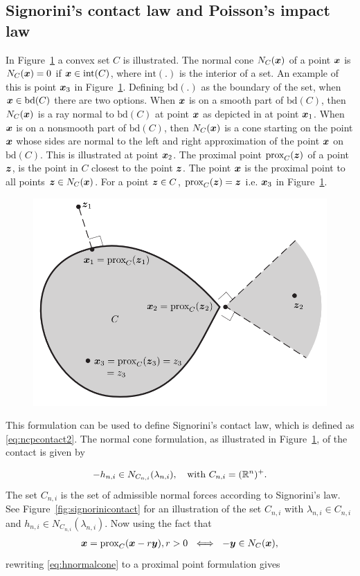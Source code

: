 \documentclass[../DC2017114Bouma.tex]{subfiles}
\begin{document}
\subsection{Signorini's contact law and Poisson's impact law}
In Figure~\ref{fig:convex} a convex set $C$ is illustrated. The normal cone $N_C({\boldsymbol{x}})$ of a point ${\boldsymbol{x}}$ is $N_C({\boldsymbol{x}})=0$ if ${\boldsymbol{x}}\in \text{int}(C)$, where $\text{int}(.)$ is the interior of a set. An example of this is point ${\boldsymbol{x}}_3$ in Figure~\ref{fig:convex}. Defining $\text{bd}(.)$ as the boundary of the set, when ${\boldsymbol{x}}\in \text{bd}(C)$ there are two options. When ${\boldsymbol{x}}$ is on a smooth part of $\text{bd}(C)$, then $N_C({\boldsymbol{x}})$ is a ray normal to $\text{bd}(C)$ at point ${\boldsymbol{x}}$ as depicted in at point ${\boldsymbol{x}}_1$. When ${\boldsymbol{x}}$ is on a nonsmooth part of $\text{bd}(C)$, then $N_C({\boldsymbol{x}})$ is a cone starting on the point ${\boldsymbol{x}}$ whose sides are normal to the left and right approximation of the point ${\boldsymbol{x}}$ on $\text{bd}(C)$. This is illustrated at point ${\boldsymbol{x}}_2$. The proximal point $\operatorname{\text{prox}}_C({\boldsymbol{z}})$ of a point ${\boldsymbol{z}}$, is the point in $C$ closest to the point ${\boldsymbol{z}}$. The point ${\boldsymbol{x}}$ is the proximal point to all points  ${\boldsymbol{z}}\in N_C({\boldsymbol{x}})$. For a point ${\boldsymbol{z}}\in C$, $\operatorname{\text{prox}}_C({\boldsymbol{z}}) = {\boldsymbol{z}}$ i.e. ${\boldsymbol{x}}_3$ in Figure~\ref{fig:convex}.

\begin{figure}[h]
\centering
\includegraphics[width=.6\textwidth]{convex.PNG}\caption{}\label{fig:convex}
\end{figure}

This formulation can be used to define Signorini's contact law, which is defined as \eqref{eq:ncpcontact2}. The normal cone formulation, as illustrated in Figure~\ref{fig:convex}, of the contact is given by

\begin{align}
-h_{n,i} \in N_{C_{n,i}}(\lambda_{n,i}),\quad \text{with }C_{n,i} = (\mathbb{R}^n)^+.\label{eq:hnormalcone}
\end{align}
The set $C_{n,i}$ is the set of admissible normal forces according to Signorini's law. See Figure~\ref{fig:signorinicontact} for an illustration of the set $C_{n,i}$ with $\lambda_{n,i}\in C_{n,i}$ and $h_{n,i} \in N_{C_{n,i}}(\lambda_{n,i})$. Now using the fact that
\begin{align}
{\boldsymbol{x}} = \operatorname{\text{prox}}_C({\boldsymbol{x}} -r{\boldsymbol{y}}), r > 0\ \iff\ -{\boldsymbol{y}}\in N_C({\boldsymbol{x}}),
\end{align}
rewriting \eqref{eq:hnormalcone} to a proximal point formulation gives 
\end{document}
